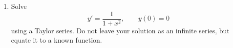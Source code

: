 \documentclass[10pt,driverfallback=hypertex]{report}
\begin{document}
\begin{enumerate}
    
  \item
    Solve
    \begin{dmath*}[compact]
      y' = \frac{1}{1+x^2}, \qquad y(0)=0
    \end{dmath*}
    using a Taylor series. Do not leave your solution as an infinite series,
    but equate it to a known function.


\end{enumerate}
\end{document}

